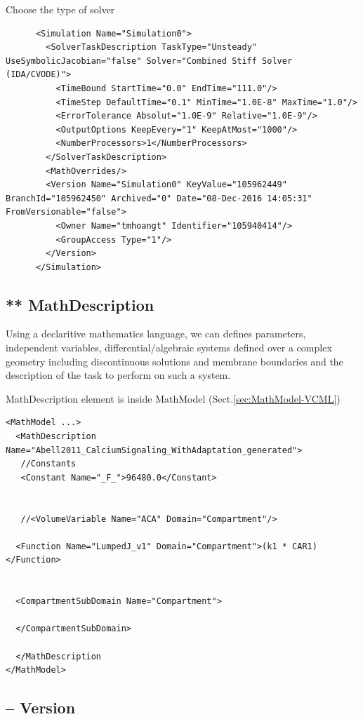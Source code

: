 Choose the type of solver

{\tiny
\begin{verbatim}
      <Simulation Name="Simulation0">
        <SolverTaskDescription TaskType="Unsteady" UseSymbolicJacobian="false" Solver="Combined Stiff Solver (IDA/CVODE)">
          <TimeBound StartTime="0.0" EndTime="111.0"/>
          <TimeStep DefaultTime="0.1" MinTime="1.0E-8" MaxTime="1.0"/>
          <ErrorTolerance Absolut="1.0E-9" Relative="1.0E-9"/>
          <OutputOptions KeepEvery="1" KeepAtMost="1000"/>
          <NumberProcessors>1</NumberProcessors>
        </SolverTaskDescription>
        <MathOverrides/>
        <Version Name="Simulation0" KeyValue="105962449" BranchId="105962450" Archived="0" Date="08-Dec-2016 14:05:31" FromVersionable="false">
          <Owner Name="tmhoangt" Identifier="105940414"/>
          <GroupAccess Type="1"/>
        </Version>
      </Simulation>
\end{verbatim}
}

\subsection{** MathDescription}
\label{sec:MathDescription-VCML}

Using a declaritive mathematics language, we can defines parameters, independent
variables, differential/algebraic systems defined over a complex geometry
including discontinuous solutions and membrane boundaries and the description of
the task to perform on such a system.

MathDescription element is inside MathModel (Sect.\ref{sec:MathModel-VCML})
{\tiny
\begin{verbatim}
<MathModel ...>
  <MathDescription Name="Abell2011_CalciumSignaling_WithAdaptation_generated">
   //Constants
   <Constant Name="_F_">96480.0</Constant>
   
   
   //<VolumeVariable Name="ACA" Domain="Compartment"/>
  
  <Function Name="LumpedJ_v1" Domain="Compartment">(k1 * CAR1)</Function>
  
  
  <CompartmentSubDomain Name="Compartment">
  
  </CompartmentSubDomain>
  
  </MathDescription
</MathModel>
\end{verbatim}
}


\subsection{-- Version}
\label{sec:Version-VCML}

